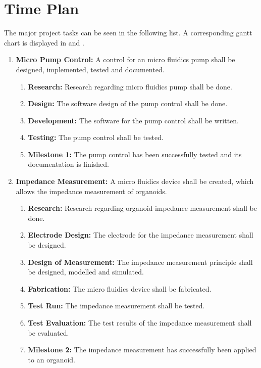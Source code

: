 \section{Time Plan}

The major project tasks can be seen in the following list. A corresponding gantt chart is displayed in  and . 
\begin{enumerate}
\item \textbf{Micro Pump Control:} A control for an micro fluidics pump shall be designed, implemented, tested and documented.
    \begin{enumerate}
        \item \textbf{Research:} Research regarding micro fluidics pump shall be done. 
        \item \textbf{Design:} The software design of the pump control shall be done.
        \item \textbf{Development:} The software for the pump control shall be written.
        \item \textbf{Testing:} The pump control shall be tested.
        \item \textbf{Milestone 1:} The pump control has been successfully tested and its documentation is finished.
    \end{enumerate}
\item \textbf{Impedance Measurement:} A micro fluidics device shall be created, which allows the impedance measurement of organoids.
    \begin{enumerate}
        \item \textbf{Research:} Research regarding organoid impedance measurement shall be done. 
        \item \textbf{Electrode Design:} The electrode for the impedance measurement shall be designed.
        \item \textbf{Design of Measurement:} The impedance measurement principle shall be designed, modelled and simulated.
        \item \textbf{Fabrication:} The micro fluidics device shall be fabricated.
        \item \textbf{Test Run:} The impedance measurement shall be tested.
        \item \textbf{Test Evaluation:} The test results of the impedance measurement shall be evaluated.
        \item \textbf{Milestone 2:} The impedance measurement has successfully been applied to an organoid.
    \end{enumerate}

\end{enumerate}
